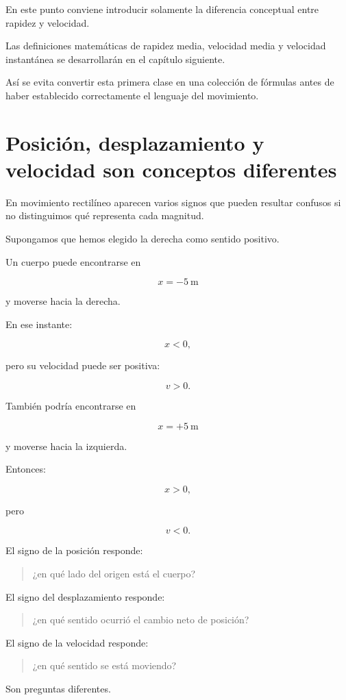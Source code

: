 \begin{notapedagogica}
En este punto conviene introducir solamente la diferencia conceptual entre
rapidez y velocidad.

Las definiciones matemáticas de rapidez media, velocidad media y velocidad
instantánea se desarrollarán en el capítulo siguiente.

Así se evita convertir esta primera clase en una colección de fórmulas antes
de haber establecido correctamente el lenguaje del movimiento.
\end{notapedagogica}


\section{Posición, desplazamiento y velocidad son conceptos diferentes}

En movimiento rectilíneo aparecen varios signos que pueden resultar
confusos si no distinguimos qué representa cada magnitud.

Supongamos que hemos elegido la derecha como sentido positivo.

Un cuerpo puede encontrarse en

\[ x=-\SI{5}{\meter} \]

y moverse hacia la derecha.

En ese instante:

\[
x<0,
\]

pero su velocidad puede ser positiva:

\[
v>0.
\]

También podría encontrarse en

\[ x=+\SI{5}{\meter} \]

y moverse hacia la izquierda.

Entonces:

\[
x>0,
\]

pero

\[
v<0.
\]

\begin{idea}
El signo de la posición responde:

\begin{quote}
¿en qué lado del origen está el cuerpo?
\end{quote}

El signo del desplazamiento responde:

\begin{quote}
¿en qué sentido ocurrió el cambio neto de posición?
\end{quote}

El signo de la velocidad responde:

\begin{quote}
¿en qué sentido se está moviendo?
\end{quote}

Son preguntas diferentes.
\end{idea}


